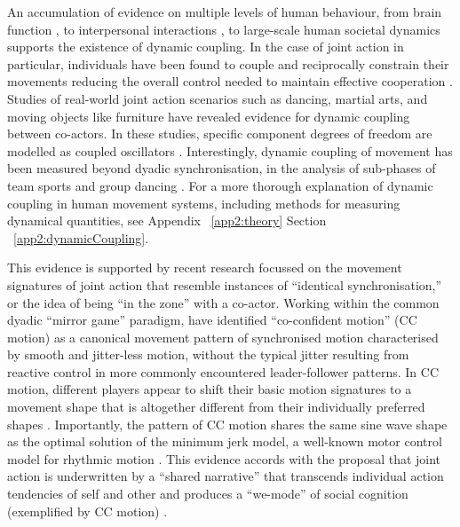 \begin{CJK}{UTF8}{gbsn}
An accumulation of evidence on multiple levels of human behaviour, from brain function \citep{Yufik1998,Sengupta2013}, to interpersonal interactions \citep{Kelso2009,Riley2011,Fusaroli2014}, to large-scale human societal dynamics \citep{Nowak2017} supports the existence of dynamic coupling.  In the case of joint action in particular, individuals have been found to couple and reciprocally constrain their movements reducing the overall control needed to maintain effective cooperation \citep{Ramenzoni2011,Ramenzoni2012,Riley2011,Schmidt1990}.  Studies of real-world joint action scenarios such as dancing, martial arts, and moving objects like furniture have revealed evidence for dynamic coupling between co-actors.  In these studies, specific component degrees of freedom are modelled as coupled oscillators \citep[using the HKB model, which describes the change in the relative phase between two oscillatory components. See][]{Haken1985,Kelso1986}.  Interestingly, dynamic coupling of movement has been measured beyond dyadic synchronisation, in the analysis of sub-phases of team sports \citep{Passos2014,Duarte2012} and group dancing \citep{Chauvigne2017}.  For a more thorough explanation of dynamic coupling in human movement systems, including methods for measuring dynamical quantities, see Appendix ~\ref{app2:theory} Section ~\ref{app2:dynamicCoupling}.

This evidence is supported by recent research focussed on the movement signatures of joint action that resemble instances of ``identical synchronisation,'' or the idea of being ``in the zone'' with a co-actor. Working within the common dyadic ``mirror game'' paradigm, \textcite{Noy2011,Noy2015,Hart2014} have identified ``co-confident motion'' (CC motion) as a canonical movement pattern of synchronised motion characterised by smooth and jitter-less motion, without the typical jitter resulting from reactive control in more commonly encountered leader-follower patterns.  In CC motion, different players appear to shift their basic motion signatures to a movement shape that is altogether different from their individually preferred shapes \citep{Hart2014}. Importantly, the pattern of CC motion shares the same sine wave shape as the optimal solution of the minimum jerk model, a well-known motor control model for rhythmic motion \citep{Hogan2007}.  This evidence accords with the proposal that joint action is underwritten by a ``shared narrative'' that transcends individual action tendencies of self and other and produces a  ``we-mode'' of social cognition (exemplified by CC motion) \citep{Gallotti2013}.


\end{CJK}
